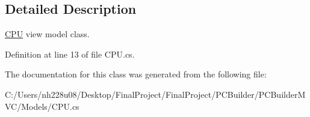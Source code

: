 \subsection{Detailed Description}
\hyperlink{class_p_c_builder_m_v_c_1_1_models_1_1_c_p_u}{C\+PU} view model class. 



Definition at line 13 of file C\+P\+U.\+cs.



The documentation for this class was generated from the following file\+:\begin{DoxyCompactItemize}
\item 
C\+:/\+Users/nh228u08/\+Desktop/\+Final\+Project/\+Final\+Project/\+P\+C\+Builder/\+P\+C\+Builder\+M\+V\+C/\+Models/C\+P\+U.\+cs\end{DoxyCompactItemize}

